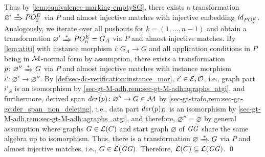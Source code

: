 Thus by \cref{lem:equivalence-marking-emptySG}, there exists a transformation $\varnothing' \Trans{*} PO^E_2$ via $P$ and almost injective matches with injective embedding $\mathit{id}_{PO^E_2}$.
Analogously, we iterate over all pushouts for $k=(1,\ldots,n-1)$ and obtain a transformation $\varnothing' \Trans{*} PO^E_n=G_A$ via $P$ and almost injective matches.
By \cref{lem:atiti} with instance morphism $i\colon G_A \to G$ and all application conditions in $P$ being in ${\cal M}$-normal form by assumption, there exists a transformation $p\colon \varnothing'' \Trans{*} G$ via $P$ and almost injective matches with instance morphism $i'\colon \varnothing' \to \varnothing''$.
By \cref{def:sec-dc-verification:instance_mor}, $i' \in \mathcal{E},{\cal O}$, i.e., graph part $i'_S$ is an isomorphism by \cref{sec-gt-M-adh,rem:sec-gt-M-adh:agraphs_atgi}, and furthermore, derived span $\mathit{der}(p)\colon \varnothing'' \to G \in {\cal M}$ by \cref{sec-gt-trafo,rem:sec-gc-gc:der_span_non_deleting}, i.e., data part $\mathit{der}(p)_D$ is an isomorphism by \cref{sec-gt-M-adh,rem:sec-gt-M-adh:agraphs_atgi}, and therefore, $\varnothing''=\varnothing$ by general assumption where graphs $G \in \mathcal{L}(C)$ and start graph $\varnothing$ of $\mathit{GG}$ share the same algebra up to isomorphism.
Thus, there is a transformation $\varnothing \Trans{*} G$ via $P$ and almost injective matches, i.e., $G \in \mathcal{L}(\mathit{GG})$.
Therefore, $\mathcal{L}(C) \subseteq \mathcal{L}(\mathit{GG})$.
\qed

